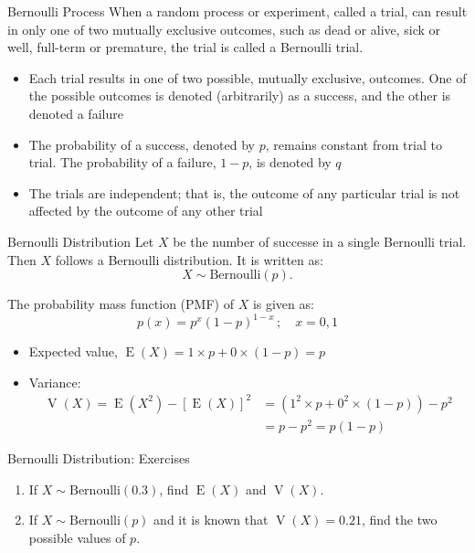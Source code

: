 \documentclass[12pt, aspectratio=169]{beamer}
\DeclareMathOperator{\E}{E}
\DeclareMathOperator{\V}{V}
\begin{document}
	\begin{frame}{Bernoulli Process}
		When a random process or experiment, called a trial, can result in only one of two mutually exclusive outcomes, such as dead or alive, sick or well, full-term or premature, the trial is called a Bernoulli trial.

		\begin{itemize}
			\item Each trial results in one of two possible, mutually exclusive, outcomes. One of the possible outcomes is denoted (arbitrarily) as a success, and the other is denoted a failure
			\item The probability of a success, denoted by $p$, remains constant from trial to trial. The probability of a failure, $1 - p$, is denoted by $q$
			\item The trials are independent; that is, the outcome of any particular trial is not affected by the outcome of any other trial
		\end{itemize}
	\end{frame}


	\begin{frame}{Bernoulli Distribution}
		Let $X$ be the number of successe in a single Bernoulli trial. Then $X$ follows a Bernoulli distribution. It is written as:
		\[X \sim \mathrm{Bernoulli}(p).\]

		The probability mass function (PMF) of $X$ is given as:
		\[
			p(x) = p^x (1-p)^{1-x} \, ; \quad x = 0, 1
		\]

		\begin{itemize}
			\item Expected value, \(\E(X) = 1 \times p + 0 \times (1-p) = p\)
			\item Variance: \begin{align*}
				\V(X) = \E(X^2) - [\E(X)]^2 &= (1^2 \times p + 0^2 \times (1-p)) - p^2 \\
				 &= p - p^2 = p(1-p)
			\end{align*}
		\end{itemize}
	\end{frame}


	\begin{frame}{Bernoulli Distribution: Exercises}
		\begin{enumerate}
			\item If \(X \sim \mathrm{Bernoulli}(0.3)\), find \(\E(X)\) and \(\V(X)\).
			\item If \(X \sim \mathrm{Bernoulli}(p)\) and it is known that \(\V(X) = 0.21\), find the two possible values of \(p\).
		\end{enumerate}
	\end{frame}
\end{document}
